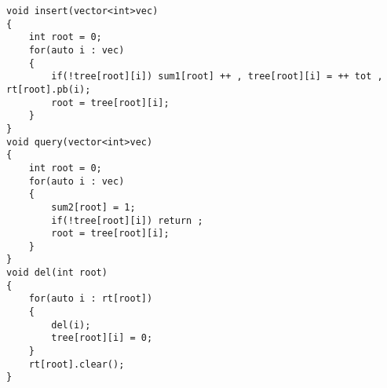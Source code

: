 \documentclass[E:/GsjzTle/main/main.tex]{subfiles}
\begin{document}
\begin{lstlisting}
void insert(vector<int>vec)
{
	int root = 0;
	for(auto i : vec)
	{
		if(!tree[root][i]) sum1[root] ++ , tree[root][i] = ++ tot , rt[root].pb(i);
		root = tree[root][i];
	}
} 
void query(vector<int>vec)
{
	int root = 0;
	for(auto i : vec)
	{
		sum2[root] = 1;
		if(!tree[root][i]) return ;
		root = tree[root][i];
	}
}
void del(int root)
{
	for(auto i : rt[root])
	{
		del(i);
		tree[root][i] = 0;
	} 
	rt[root].clear();
}
\end{lstlisting}
\end{document}
